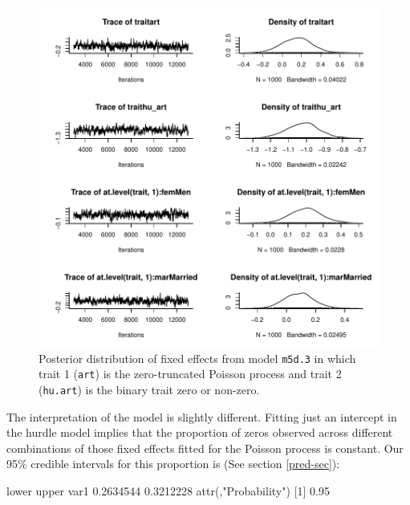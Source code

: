 \documentclass{article}
\begin{document}
\begin{figure}[!h]
\begin{center}
\includegraphics{Lecture5-046}
\end{center}
\caption{Posterior distribution of fixed effects from model \texttt{m5d.3} in which trait 1 (\texttt{art}) is the zero-truncated Poisson process and trait 2 (\texttt{hu.art}) is the binary trait zero or non-zero.}
\label{HU}
\end{figure}

The interpretation of the model is slightly different. Fitting just an intercept in the hurdle model implies that the proportion of zeros observed across different combinations of those fixed effects fitted for the Poisson process is constant. Our 95\% credible intervals for this proportion is (See section \ref{pred-sec}):

\begin{Schunk}
\begin{Soutput}
         lower     upper
var1 0.2634544 0.3212228
attr(,"Probability")
[1] 0.95
\end{Soutput}
\end{Schunk}
\end{document}
